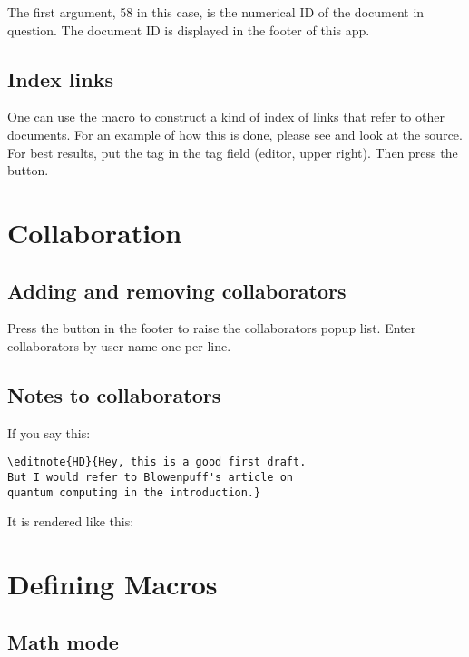 The first argument, 58 in this case, is the numerical ID of the document in question. The document ID is displayed in the footer of this app.

\subsection{Index links}

One can use the  macro to construct a kind of index of links that refer to other documents.  For an example of how this is done, please see  and look at the source. For best results, put the tag  in the tag field (editor, upper right).  Then press the  button.

\section{Collaboration}

\subsection{Adding and removing collaborators}

Press the  button in the footer to raise the collaborators popup list.  Enter collaborators by user name one per line.


\subsection{Notes to collaborators}

If you say this:

\begin{verbatim}
\editnote{HD}{Hey, this is a good first draft.
But I would refer to Blowenpuff's article on
quantum computing in the introduction.}
\end{verbatim}

It is rendered like this:


\section{Defining Macros}

\subsection{Math mode}

